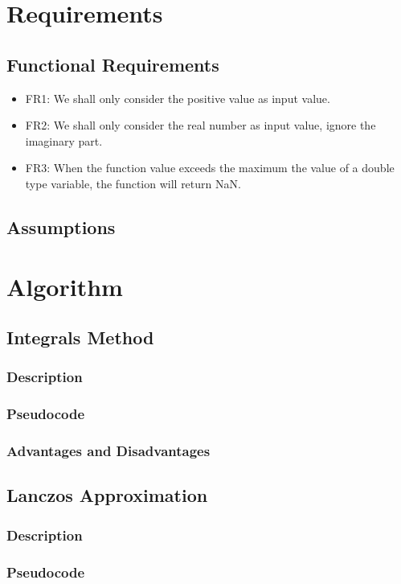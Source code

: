 \documentclass{report}
\begin{document}
\section{Requirements}
\subsection{Functional Requirements}
\begin{itemize}
\item FR1: We shall only consider the positive value as input value.
\item FR2: We shall only consider the real number as input value, ignore the imaginary part.
\item FR3: When the function value exceeds the maximum the value of a double type variable, the function will return NaN.
\end{itemize}
\subsection{Assumptions}

\section{Algorithm}
\subsection{Integrals Method}
\subsubsection{Description}
\subsubsection{Pseudocode}
\subsubsection{Advantages and Disadvantages}
\subsection{Lanczos Approximation}
\subsubsection{Description}
\subsubsection{Pseudocode}
\end{document}
